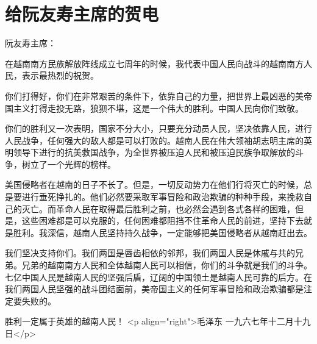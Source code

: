 \section[给阮友寿主席的贺电（一九六七年十二月十九日）]{给阮友寿主席的贺电}


阮友寿主席：

在越南南方民族解放阵线成立七周年的时候，我代表中国人民向战斗的越南南方人民，表示最热烈的祝贺。

你们打得好，你们在非常艰苦的条件下，依靠自己的力量，把世界上最凶恶的美帝国主义打得走投无路，狼狈不堪，这是一个伟大的胜利。中国人民向你们致敬。

你们的胜利又一次表明，国家不分大小，只要充分动员人民，坚决依靠人民，进行人民战争，任何强大的敌人都是可以打败的。越南人民在伟大领袖胡志明主席的英明领导下进行的抗美救国战争，为全世界被压迫人民和被压迫民族争取解放的斗争，树立了一个光辉的榜样。

美国侵略者在越南的日子不长了。但是，一切反动势力在他们行将灭亡的时候，总是要进行垂死挣扎的。他们必然要采取军事冒险和政治欺骗的种种手段，来挽救自己的灭亡。而革命人民在取得最后胜利之前，也必然会遇到各式各样的困难，但是，这些困难都是可以克服的，任何困难都阻挡不住革命人民的前进，坚持下去就是胜利。我深信，越南人民坚持持久战争，一定能够把美国侵略者从越南赶出去。

我们坚决支持你们。我们两国是唇齿相依的邻邦，我们两国人民是休戚与共的兄弟。兄弟的越南南方人民和全体越南人民可以相信，你们的斗争就是我们的斗争。七亿中国人民是越南人民的坚强后盾，辽阔的中国领土是越南人民可靠的后方。在我们两国人民坚强的战斗团结面前，美帝国主义的任何军事冒险和政治欺骗都是注定要失败的。

胜利一定属于英雄的越南人民！
<p align="right">毛泽东
一九六七年十二月十九日</p>


